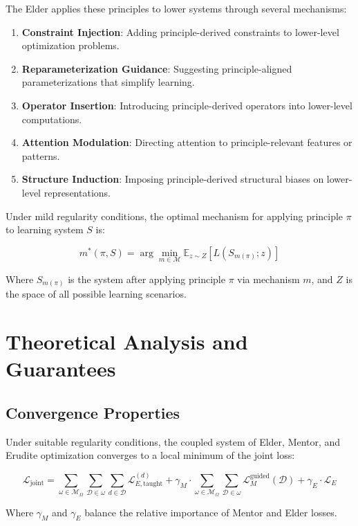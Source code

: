 The Elder applies these principles to lower systems through several mechanisms:

\begin{enumerate}
\item \textbf{Constraint Injection}: Adding principle-derived constraints to lower-level optimization problems.

\item \textbf{Reparameterization Guidance}: Suggesting principle-aligned parameterizations that simplify learning.

\item \textbf{Operator Insertion}: Introducing principle-derived operators into lower-level computations.

\item \textbf{Attention Modulation}: Directing attention to principle-relevant features or patterns.

\item \textbf{Structure Induction}: Imposing principle-derived structural biases on lower-level representations.
\end{enumerate}

\begin{theorem}
Under mild regularity conditions, the optimal mechanism for applying principle $\pi$ to learning system $S$ is:

\begin{equation}
m^*(\pi, S) = \arg\min_{m \in \mathcal{M}} \mathbb{E}_{z \sim Z}[L(S_{m(\pi)}; z)]
\end{equation}

Where $S_{m(\pi)}$ is the system after applying principle $\pi$ via mechanism $m$, and $Z$ is the space of all possible learning scenarios.
\end{theorem}

\section{Theoretical Analysis and Guarantees}

\subsection{Convergence Properties}

\begin{theorem}
Under suitable regularity conditions, the coupled system of Elder, Mentor, and Erudite optimization converges to a local minimum of the joint loss:

\begin{equation}
\mathcal{L}_{\text{joint}} = \sum_{\omega \in \mathcal{M}_{\Omega}} \sum_{\mathcal{D} \in \omega} \sum_{d \in \mathcal{D}} \mathcal{L}_{E,\text{taught}}^{(d)} + \gamma_M \cdot \sum_{\omega \in \mathcal{M}_{\Omega}} \sum_{\mathcal{D} \in \omega} \mathcal{L}_{M}^{\text{guided}}(\mathcal{D}) + \gamma_E \cdot \mathcal{L}_E
\end{equation}

Where $\gamma_M$ and $\gamma_E$ balance the relative importance of Mentor and Elder losses.
\end{theorem}

